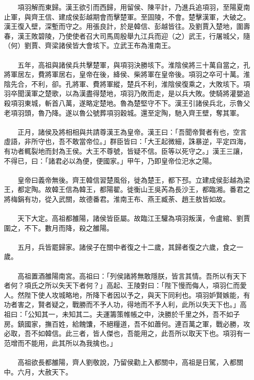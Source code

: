 　　項羽解而東歸。漢王欲引而西歸，用留侯、陳平計，乃進兵追項羽，至陽夏南止軍，與齊王信、建成侯彭越期會而擊楚軍。至固陵，不會。楚擊漢軍，大破之。漢王復入壁，深塹而守之。用張良計，於是韓信、彭越皆往。及劉賈入楚地，圍壽春，漢王敗碧陵，乃使使者召大司馬周殷舉九江兵而迎（之）武王，行屠城父，隨（何）劉賈、齊梁諸侯皆大會垓下。立武王布為淮南王。
\\\\
　　五年，高祖與諸侯兵共擊楚軍，與項羽決勝垓下。淮陰侯將三十萬自當之，孔將軍居左，費將軍居右，皇帝在後，絳侯、柴將軍在皇帝後。項羽之卒可十萬。淮陰先合，不利，卻。孔將軍、費將軍縱，楚兵不利，淮陰侯復乘之，大敗垓下。項羽卒聞漢軍之楚歌，以為漢盡得楚地，項羽乃敗而走，是以兵大敗。使騎將灌嬰追殺項羽東城，斬首八萬，遂略定楚地。魯為楚堅守不下。漢王引諸侯兵北，示魯父老項羽頭，魯乃降。遂以魯公號葬項羽穀城。還至定陶，馳入齊王壁，奪其軍。
\\\\
　　正月，諸侯及將相相與共請尊漢王為皇帝。漢王曰：「吾聞帝賢者有也，空言虛語，非所守也，吾不敢當帝位。」群臣皆曰：「大王起微細，誅暴逆，平定四海，有功者輒裂地而封為王侯。大王不尊號，皆疑不信。臣等以死守之。」漢王三讓，不得已，曰：「諸君必以為便，便國家。」甲午，乃即皇帝位汜水之陽。
\\\\
　　皇帝曰義帝無後。齊王韓信習楚風俗，徙為楚王，都下邳。立建成侯彭越為梁王，都定陶。故韓王信為韓王，都陽翟。徙衡山王吳芮為長沙王，都臨湘。番君之將梅鋗有功，從入武關，故德番君。淮南王布、燕王臧荼、趙王敖皆如故。
\\\\
　　天下大定。高祖都雒陽，諸侯皆臣屬。故臨江王驩為項羽叛漢，令盧綰、劉賈圍之，不下。數月而降，殺之雒陽。
\\\\
　　五月，兵皆罷歸家。諸侯子在關中者復之十二歲，其歸者復之六歲，食之一歲。
\\\\
　　高祖置酒雒陽南宮。高祖曰：「列侯諸將無敢隱朕，皆言其情。吾所以有天下者何？項氏之所以失天下者何？」高起、王陵對曰：「陛下慢而侮人，項羽仁而愛人。然陛下使人攻城略地，所降下者因以予之，與天下同利也。項羽妒賢嫉能，有功者害之，賢者疑之，戰勝而不予人功，得地而不予人利，此所以失天下也。」高祖曰：「公知其一，未知其二。夫運籌策帷帳之中，決勝於千里之外，吾不如子房。鎮國家，撫百姓，給餽馕，不絕糧道，吾不如蕭何。連百萬之軍，戰必勝，攻必取，吾不如韓信。此三者，皆人傑也，吾能用之，此吾所以取天下也。項羽有一范增而不能用，此其所以為我擒也。」
\\\\
　　高祖欲長都雒陽，齊人劉敬說，乃留侯勸上入都關中，高祖是日駕，入都關中。六月，大赦天下。

